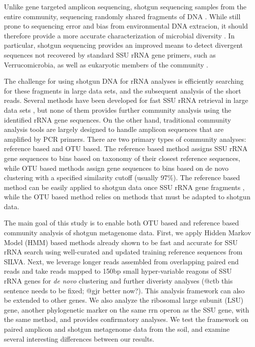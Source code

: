 \documentclass[12pt]{article}
\begin{document}
Unlike gene targeted amplicon sequencing, shotgun sequencing samples from the
entire community, sequencing randomly shared fragments of DNA
\cite{shotgun2004,metahit2010}. While still prone to sequencing error and bias
from environmental DNA extracion, it should therefore provide a more accurate
characterization of microbial diversity \cite{chimeraslayer}.  In particular,
shotgun sequencing provides an improved means to detect divergent sequences not
recovered by standard SSU rRNA gene primers, such as Verrucomicrobia, as well
as eukaryotic members of the community
\cite{baker2003,primereva2008,verruco2011}.

The challenge for using shotgun DNA for rRNA analyses is efficiently searching
for these fragments in large data sets, and the subsequent analysis of the
short reads.  Several methods have been developed for fast SSU rRNA retrieval
in large data sets \cite{ribopicker,metarna,rrnaselector,metaxa}, but none of
them provides further community analysis using the identified rRNA gene
sequences. On the other hand, traditional community analysis tools
\cite{rdp2009,mothur,qiime} are largely designed to handle amplicon sequences
that are amplified by PCR primers. There are two primary types of community
analyses: reference based and OTU based. The reference based method assigns SSU
rRNA gene sequences to bins based on taxonomy of their closest reference
sequences, while OTU based methods assign gene sequences to bins based on de
novo clustering with a specified similarity cutoff (usually 97\%). The
reference based method can be easily applied to shotgun data once SSU rRNA gene
fragments \cite{rdpclassifier}, while the OTU based method relies on methods
that must be adapted to shotgun data.

The main goal of this study is to enable both OTU based and reference
based community analysis of shotgun metagenome data. First, we apply
Hidden Markov Model (HMM) based methods already shown to be fast and
accurate for SSU rRNA search \cite{metarna,rrnaselector,metaxa} using
well-curated and updated training reference sequences from SILVA.
Next, we leverage longer reads assembled from overlapping paired end
reads and take reads mapped to 150bp small hyper-variable reagons of
SSU rRNA genes for {\em de novo} clustering and further diveristy analyses
(@ctb this sentence needs to be fixed; @gjr better now?). This
analysis framework can also be extended to other genes. We also
analyze the ribosomal large subunit (LSU) gene, another phylogenetic
marker on the same rrn operon as the SSU gene, with the same method,
and provides confirmatory analyses. We test the framework on paired
amplicon and shotgun metagenome data from the soil, and examine
several interesting differences between our results.
\end{document}
